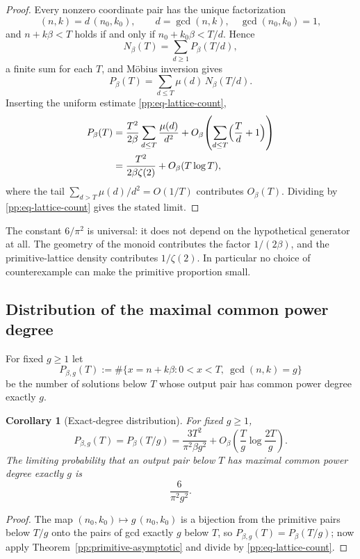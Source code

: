 \documentclass[11pt,oneside]{article}
\newtheorem{corollary}[theorem]{Corollary}
\theoremstyle{definition}
\theoremstyle{remark}
\begin{document}
\begin{proof}
Every nonzero coordinate pair has the unique factorization
\[
 (n,k)=d\,(n_0,k_0),\qquad d=\gcd(n,k),\quad\gcd(n_0,k_0)=1,
\]
and $n+k\beta<T$ holds if and only if $n_0+k_0\beta<T/d$.  Hence
\[
 N_{\beta}(T)=\sum_{d\ge1}P_{\beta}(T/d),
\]
a finite sum for each $T$, and M\"obius inversion gives
\[
 P_{\beta}(T)=\sum_{d\le T}\mu(d)\,N_{\beta}(T/d).
\]
Inserting the uniform estimate \eqref{pp:eq-lattice-count},
\[
\begin{aligned}
 P_{\beta}(T)
 &=\frac{T^2}{2\beta}\sum_{d\le T}\frac{\mu(d)}{d^2}
   +O_{\beta}\!\left(\sum_{d\le T}\Bigl(\frac Td+1\Bigr)\right)\\
 &=\frac{T^2}{2\beta\zeta(2)}+O_{\beta}(T\log T),
\end{aligned}
\]
where the tail $\sum_{d>T}\mu(d)/d^2=O(1/T)$ contributes $O_{\beta}(T)$.  Dividing by
\eqref{pp:eq-lattice-count} gives the stated limit.
\end{proof}

The constant $6/\pi^2$ is universal: it does not depend on the hypothetical generator at all.
The geometry of the monoid contributes the factor $1/(2\beta)$, and the primitive-lattice
density contributes $1/\zeta(2)$.  In particular no choice of counterexample can make the
primitive proportion small.

\subsection{Distribution of the maximal common power degree}

For fixed $g\ge1$ let
\[
 P_{\beta,g}(T):=\#\bigl\{x=n+k\beta:0<x<T,\ \gcd(n,k)=g\bigr\}
\]
be the number of solutions below $T$ whose output pair has common power degree exactly $g$.

\begin{corollary}[Exact-degree distribution]
\label{pp:degree-distribution}
For fixed $g\ge1$,
\[
 P_{\beta,g}(T)=P_{\beta}(T/g)
 =\frac{3T^2}{\pi^2\beta g^2}
  +O_{\beta}\!\left(\frac Tg\log\frac{2T}{g}\right).
\]
The limiting probability that an output pair below $T$ has maximal common power degree exactly
$g$ is
\[
 \frac6{\pi^2g^2}.
\]
\end{corollary}

\begin{proof}
The map $(n_0,k_0)\mapsto g\,(n_0,k_0)$ is a bijection from the primitive pairs below $T/g$
onto the pairs of gcd exactly $g$ below $T$, so $P_{\beta,g}(T)=P_{\beta}(T/g)$; now apply
Theorem~\ref{pp:primitive-asymptotic} and divide by \eqref{pp:eq-lattice-count}.
\end{proof}
\end{document}
